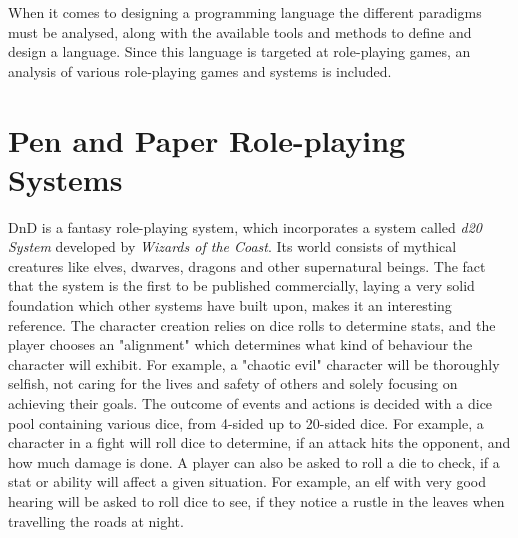 When it comes to designing a programming language the different paradigms must be analysed, along with the available tools and methods to define and design a language. Since this language is targeted at role-playing games, an analysis of various role-playing games and systems is included.

\begin{comment}
\section{Analysis of Role-playing systems}

As mention the basic idea of a role-playing game is interactive story-telling. The game consists of several players and a \ac{gm}. The \ac{gm} is the mastermind behind the story being acted out, called the scenario. They are in charge of writing the plot of the scenario, and guiding the players through it, all the while allowing them to shape the individual encounters and scenes, but maintaining the greater story-arc. The players receive points for their characters surviving battles, using skills or sometimes as a reward to the player for excellent roleplaying of the character. Often dice are used to introduce randomness in determining the outcome of actions. The use of dice is incorporated into popular role-playing systems like Dungeons \& Dragons (DnD) and World of Darkness (WoD), both very popular pen and paper roleplaying systems.
\end{comment}

\section{Pen and Paper Role-playing Systems}

DnD is a fantasy role-playing system, which incorporates a system called \emph{d20 System} developed by \emph{Wizards of the Coast}.
Its world consists of mythical creatures like elves, dwarves, dragons and other supernatural beings. The fact that the system is the first to be published commercially, laying a very solid foundation which other systems have built upon, makes it an interesting reference. The character creation relies on dice rolls to determine stats, and the player chooses an "alignment" which determines what kind of behaviour the character will exhibit. For example, a "chaotic evil" character will be thoroughly selfish, not caring for the lives and safety of others and solely focusing on achieving their goals.
The outcome of events and actions is decided with a dice pool containing various dice, from 4-sided up to 20-sided dice. For example, a character in a fight will roll dice to determine, if an attack hits the opponent, and how much damage is done. A player can also be asked to roll a die to check, if a stat or ability will affect a given situation. For example, an elf with very good hearing will be asked to roll dice to see, if they notice a rustle in the leaves when travelling the roads at night.\cite{dnd}

